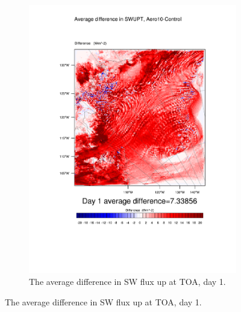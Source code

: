\begin{figure}
\begin{subfigure}{0.48\textwidth}
		\includegraphics[width=\textwidth]{results/aero10/diff_Aero10_SWUPT_Day1.pdf}
		\caption{The average difference in SW flux up at TOA, day 1.}
		\label{subfig:swup_r3Day1}
	\end{subfigure}
	

\end{figure}
